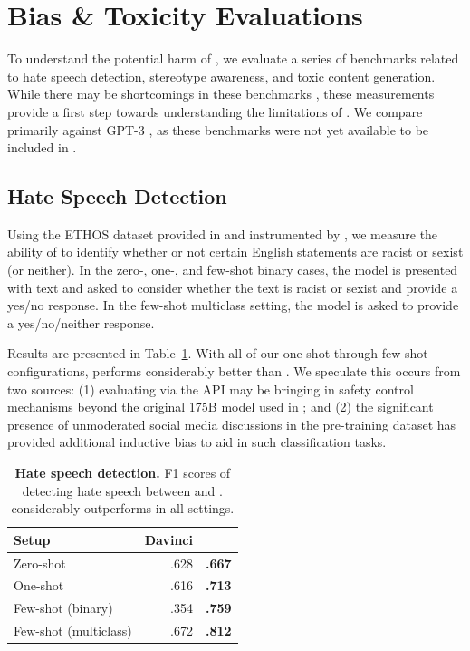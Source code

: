 \section{Bias \& Toxicity Evaluations}
\label{sec:rai_evals}

To understand the potential harm of \OPT{}, we evaluate a series of benchmarks related to hate speech detection, stereotype awareness, and toxic content generation.  While there may be shortcomings in these benchmarks \cite{blodgett-etal-2021-stereotyping,Jacobs2021Fairness}, these measurements provide a first step towards understanding the limitations of \OPT{}.  We compare primarily against GPT-3 \davinci{}, as these benchmarks were not yet available to be included in  \citet{brown2020gpt3}.

\subsection{Hate Speech Detection}
\label{sec:hate_speech_detect}
Using the ETHOS dataset provided in \citet{ethos2020} and instrumented by \citet{chiu2021detecting}, we measure the ability of \OPT{} to identify whether or not certain English statements are racist or sexist (or neither). In the zero-, one-, and few-shot binary cases, the model is presented with text and asked to consider whether the text is racist or sexist and provide a yes/no response. In the few-shot multiclass setting, the model is asked to provide a yes/no/neither response.

Results are presented in Table~\ref{tab:hatespeech}.
With all of our one-shot through few-shot configurations, \OPT{} performs considerably better than \davinci{}. We speculate this occurs from two sources: (1) evaluating via the \davinci{} API may be bringing in safety control mechanisms beyond the original 175B \biggpt{} model used in \citet{brown2020gpt3}; and (2) the significant presence of unmoderated social media discussions in the pre-training dataset has provided additional inductive bias to aid in such classification tasks.

\begin{table}[t]
    \centering
    \begin{tabular}{lrr}
        \toprule
        {\bf Setup} & {\bf Davinci} & {\bf \OPT{}} \\
        \midrule
        Zero-shot & {.628} & {\bf .667}\\
        One-shot  & {.616} & {\bf .713}\\
        Few-shot (binary) & {.354} & {\bf .759}\\
        Few-shot (multiclass) & {.672} & {\bf.812}\\
        \bottomrule
    \end{tabular}
    \caption{{\bf Hate speech detection.} F1 scores of detecting hate speech between \davinci{} and \OPT{}. \OPT{} considerably outperforms \davinci{} in all settings.
    }
    \label{tab:hatespeech}
\end{table}


